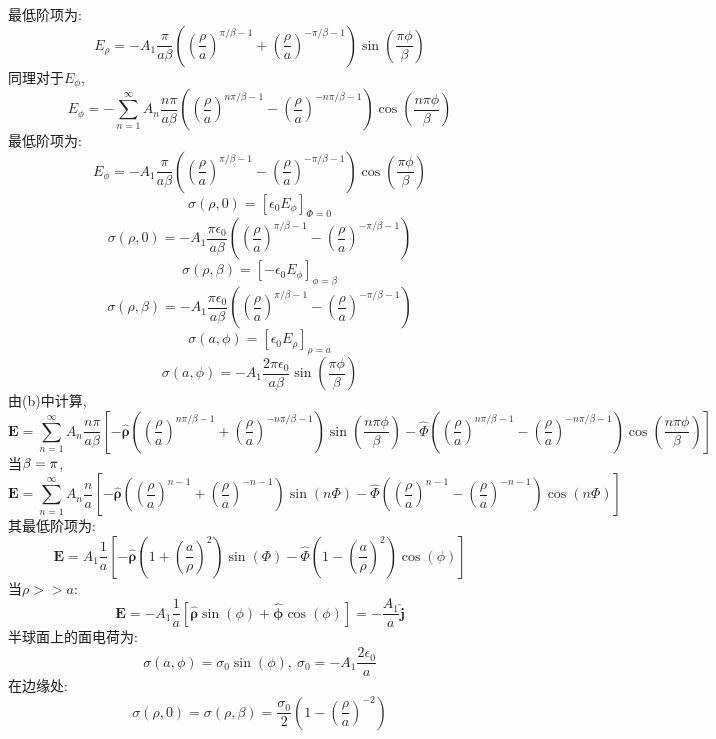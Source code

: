 \documentclass[UTF8,9pt]{ctexart}
\begin{document}
最低阶项为:
$$ 
E_{\rho}=-A_{1} \frac{\pi}{a \beta}\left(\left(\frac{\rho}{a}\right)^{\pi / \beta-1}+\left(\frac{\rho}{a}\right)^{-\pi / \beta-1}\right) \sin \left(\frac{\pi \phi}{\beta}\right)
 $$
同理对于$E_\phi$,
$$ 
E_{\phi}=-\sum_{n=1}^{\infty} A_{n} \frac{n \pi}{a \beta}\left(\left(\frac{\rho}{a}\right)^{n \pi / \beta-1}-\left(\frac{\rho}{a}\right)^{-n \pi / \beta-1}\right) \cos \left(\frac{n \pi \phi}{\beta}\right)
 $$
 最低阶项为:
 $$ 
E_{\phi}=-A_{1} \frac{\pi}{a \beta}\left(\left(\frac{\rho}{a}\right)^{\pi / \beta-1}-\left(\frac{\rho}{a}\right)^{-\pi / \beta-1}\right) \cos \left(\frac{\pi \phi}{\beta}\right)
$$
$$ 
\sigma(\rho, 0)=\left[\epsilon_{0} E_{\phi}\right]_{\Phi=0}
$$
$$ 
\sigma(\rho, 0)=-A_{1} \frac{\pi \epsilon_{0}}{a \beta}\left(\left(\frac{\rho}{a}\right)^{\pi / \beta-1}-\left(\frac{\rho}{a}\right)^{-\pi / \beta-1}\right)
$$
$$ 
\sigma(\rho, \beta)=\left[-\epsilon_{0} E_{\phi}\right]_{\phi=\beta}
    $$
    $$ 
\sigma(\rho, \beta)=-A_{1} \frac{\pi \epsilon_{0}}{a \beta}\left(\left(\frac{\rho}{a}\right)^{\pi / \beta-1}-\left(\frac{\rho}{a}\right)^{-\pi / \beta-1}\right)
$$
$$ 
\sigma(a, \phi)=\left[\epsilon_{0} E_{\rho}\right]_{\rho=a}
$$
$$ 
\sigma(a, \phi)=-A_{1} \frac{2 \pi \epsilon_{0}}{a \beta} \sin \left(\frac{\pi \phi}{\beta}\right)
$$
由(b)中计算,
$$ 
\mathbf{E}=\sum_{n=1}^{\infty} A_{n} \frac{n \pi}{a \beta}\left[-\hat{\bm{\rho}}\left(\left(\frac{\rho}{a}\right)^{n \pi / \beta-1}+\left(\frac{\rho}{a}\right)^{-n \pi / \beta-1}\right) \sin \left(\frac{n \pi \phi}{\beta}\right)-\hat{\Phi}\left(\left(\frac{\rho}{a}\right)^{n \pi / \beta-1}-\left(\frac{\rho}{a}\right)^{-n \pi / \beta-1}\right) \cos \left(\frac{n \pi \phi}{\beta}\right)\right]
 $$
当$\beta=\pi$, 
$$ 
\mathbf{E}=\sum_{n=1}^{\infty} A_{n} \frac{n}{a}\left[-\hat{\boldsymbol{\rho}}\left(\left(\frac{\rho}{a}\right)^{n-1}+\left(\frac{\rho}{a}\right)^{-n-1}\right) \sin (n \Phi)-\hat{\Phi}\left(\left(\frac{\rho}{a}\right)^{n-1}-\left(\frac{\rho}{a}\right)^{-n-1}\right) \cos (n \Phi)\right]
 $$
其最低阶项为:
$$ 
\mathbf{E}=A_{1} \frac{1}{a}\left[-\hat{\boldsymbol{\rho}}\left(1+\left(\frac{a}{\rho}\right)^{2}\right) \sin (\Phi)-\hat{\Phi}\left(1-\left(\frac{a}{\rho}\right)^{2}\right) \cos (\phi)\right]
 $$
当$\rho>>a$:
$$ 
\mathbf{E}=-A_{1} \frac{1}{a}[\hat{\boldsymbol{\rho}} \sin (\phi)+\hat{\mathbf{\phi}} \cos (\phi)] = -\frac{A_{1}}{a} \hat{\mathbf{j}}
 $$
半球面上的面电荷为:
$$ 
\sigma(a, \phi)=\sigma_{0} \sin (\phi),\  \sigma_{0}=-A_{1} \frac{2 \epsilon_{0}}{a}
  $$
在边缘处:
$$ 
\sigma(\rho, 0)=\sigma(\rho, \beta)=\frac{\sigma_{0}}{2}\left(1-\left(\frac{\rho}{a}\right)^{-2}\right)
 $$
\end{document}
